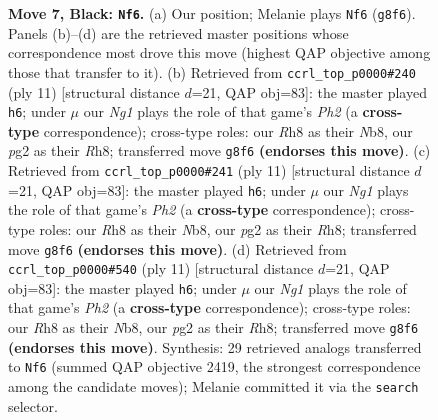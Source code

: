 \documentclass[11pt]{article}
\begin{document}
\begin{figure}[p]
\caption{\textbf{Move 7, Black: \texttt{Nf6}.} (a) Our position; Melanie plays \texttt{Nf6} (\texttt{g8f6}). Panels (b)--(d) are the retrieved master positions whose correspondence most drove this move (highest QAP objective among those that transfer to it). (b) Retrieved from \texttt{ccrl\_top\_p0000\#240} (ply 11) [structural distance $d$=21, QAP obj=83]: the master played \texttt{h6}; under $\mu$ our \emph{Ng1} plays the role of that game's \emph{Ph2} (a \textbf{cross-type} correspondence); cross-type roles: our \emph{R}h8 as their \emph{N}b8, our \emph{p}g2 as their \emph{R}h8; transferred move \texttt{g8f6} \textbf{(endorses this move)}. (c) Retrieved from \texttt{ccrl\_top\_p0000\#241} (ply 11) [structural distance $d$=21, QAP obj=83]: the master played \texttt{h6}; under $\mu$ our \emph{Ng1} plays the role of that game's \emph{Ph2} (a \textbf{cross-type} correspondence); cross-type roles: our \emph{R}h8 as their \emph{N}b8, our \emph{p}g2 as their \emph{R}h8; transferred move \texttt{g8f6} \textbf{(endorses this move)}. (d) Retrieved from \texttt{ccrl\_top\_p0000\#540} (ply 11) [structural distance $d$=21, QAP obj=83]: the master played \texttt{h6}; under $\mu$ our \emph{Ng1} plays the role of that game's \emph{Ph2} (a \textbf{cross-type} correspondence); cross-type roles: our \emph{R}h8 as their \emph{N}b8, our \emph{p}g2 as their \emph{R}h8; transferred move \texttt{g8f6} \textbf{(endorses this move)}. Synthesis: 29 retrieved analogs transferred to \texttt{Nf6} (summed QAP objective 2419, the strongest correspondence among the candidate moves); Melanie committed it via the \texttt{search} selector.}
\label{fig:thought-m13}
\end{figure}

\clearpage
\end{document}
